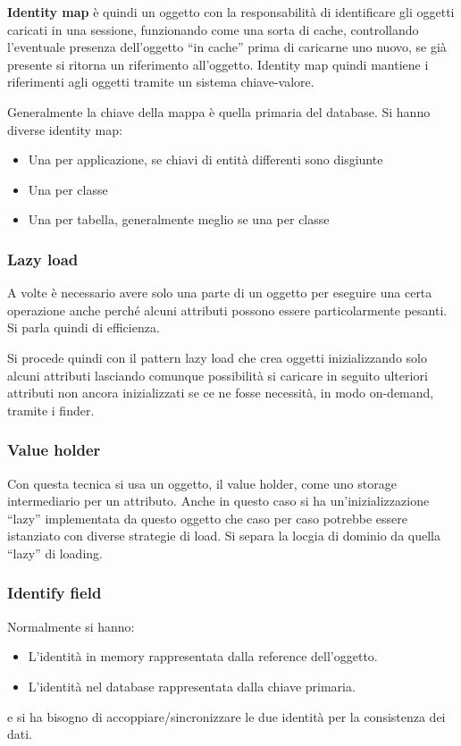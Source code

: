 \textbf{Identity map} è quindi un oggetto con la responsabilità di identificare
gli oggetti caricati in una sessione, funzionando come una sorta di cache,
controllando l'eventuale presenza dell'oggetto “in cache” prima di caricarne uno
nuovo, se già presente si ritorna un riferimento
all'oggetto. Identity map quindi mantiene i riferimenti agli oggetti tramite un
sistema chiave-valore.

Generalmente la chiave della mappa è quella primaria del database. Si hanno
diverse identity map:
\begin{itemize}
    \item Una per applicazione, se chiavi di entità differenti sono disgiunte
    \item Una per classe
    \item Una per tabella, generalmente meglio se una per classe
\end{itemize}
\subsubsection{Lazy load}
A volte è necessario avere solo una parte di un oggetto per eseguire una certa
operazione anche perché alcuni attributi possono essere particolarmente pesanti.
Si parla quindi di efficienza.

Si procede quindi con il pattern lazy load che crea oggetti inizializzando solo
alcuni attributi lasciando comunque possibilità si caricare in seguito ulteriori
attributi non ancora inizializzati se ce ne fosse necessità, in modo on-demand,
tramite i finder.
\subsubsection{Value holder}
Con questa tecnica si usa un oggetto, il value holder, come uno storage
intermediario per un attributo. Anche in questo caso si ha un'inizializzazione
“lazy” implementata da questo oggetto che caso per caso potrebbe essere istanziato
con diverse strategie di load. Si separa la locgia di dominio da quella “lazy” di loading.
\subsubsection{Identify field}
Normalmente si hanno:
\begin{itemize}
    \item L'identità in memory rappresentata dalla reference dell'oggetto.
    \item L'identità nel database rappresentata dalla chiave primaria.
\end{itemize}
e si ha bisogno di accoppiare/sincronizzare le due identità per la consistenza
dei dati.


